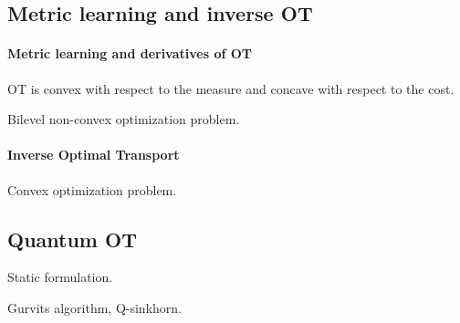 \subsection{Metric learning and inverse OT}

\paragraph{Metric learning and derivatives of OT}

OT is convex with respect to the measure and concave with respect to the cost.

Bilevel non-convex optimization problem.

\paragraph{Inverse Optimal Transport}

Convex optimization problem. 


\subsection{Quantum OT}

Static formulation.

Gurvits algorithm, Q-sinkhorn.
\fi